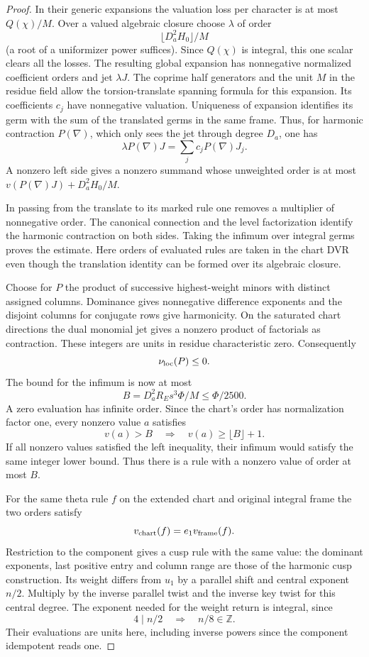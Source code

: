 \begin{proof}
In their generic expansions the valuation loss
per character is at most \(Q(\chi)/M\). Over a valued
algebraic closure choose \(\lambda\) of order
\[
 \lfloor D_a^2 H_0\rfloor/M
\]
(a root of a uniformizer
power suffices). Since \(Q(\chi)\) is integral, this
one scalar clears all the losses. The resulting global
expansion has nonnegative normalized coefficient orders
and jet \(\lambda J\).
The coprime half generators
and the unit \(M\) in the residue field allow the
torsion-translate spanning formula for this expansion.
Its coefficients \(c_j\) have nonnegative valuation.
Uniqueness of expansion identifies its germ with the
sum of the translated germs in the same frame. Thus,
for harmonic contraction \(P(\nabla)\), which only sees
the jet through degree \(D_a\), one has
\[
 \lambda P(\nabla)J=\sum_j c_j P(\nabla)J_j.
\]
A nonzero left side gives a nonzero summand whose
unweighted order is at most
\(v(P(\nabla)J)+D_a^2H_0/M\).

In passing from the
translate to its marked rule one removes a multiplier
of nonnegative order. The canonical connection and the
level factorization identify the harmonic contraction on
both sides. Taking the infimum over integral germs proves
the estimate. Here orders of evaluated rules are taken in
the chart DVR even though the translation identity can be
formed over its algebraic closure.
\label{cor:deep-boundary-orders-6}

Choose for \(P\) the product of successive highest-weight
minors with distinct assigned columns. Dominance gives
nonnegative difference exponents and the disjoint columns
for conjugate rows give harmonicity. On the saturated
chart directions the dual monomial jet gives a nonzero
product of factorials as contraction. These integers
are units in residue characteristic zero. Consequently
\[
 \nu_{\rm loc}(P)\le0.
\]
The bound for the infimum
is now at most \[
 B=D_a^2R_Es^3\Phi/M\le\Phi/2500.
\]
A zero evaluation has infinite order. Since the chart's order has normalization factor one, every nonzero value \(a\) satisfies
\[
 v(a)>B\quad\Longrightarrow\quad v(a)\ge\lfloor B\rfloor+1.
\]
If all nonzero values satisfied the left inequality, their infimum would satisfy the same integer lower bound. Thus there is
a rule with a nonzero value of order at most \(B\).

For the same theta rule \(f\) on the extended chart and original integral frame the two orders satisfy
\[
 v_{\rm chart}(f)=e_1 v_{\rm frame}(f).
\]
Restriction to the component gives a cusp rule
with the same value: the dominant exponents, last positive
entry and column range are those of the harmonic cusp
construction. Its weight differs from \(u_1\) by a parallel
shift and central exponent \(n/2\). Multiply by the
inverse parallel twist and the inverse key twist for this
central degree. The exponent needed for the weight return is integral, since
\[
 4\mid n/2\quad\Longrightarrow\quad n/8\in\mathbb Z.
\]
Their evaluations are units here,
including inverse powers since the component idempotent
reads one.


\end{proof}
